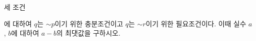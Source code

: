 세 조건\par\smallskip{}\par{}\par\smallskip\noindent 에 대하여 $q$는 ${\sim}p$이기 위한 충분조건이고 $q$는 ${\sim}r$이기 위한 필요조건이다. 이때 실수 $a$, $b$에 대하여 $a-b$의 최댓값을 구하시오. 
